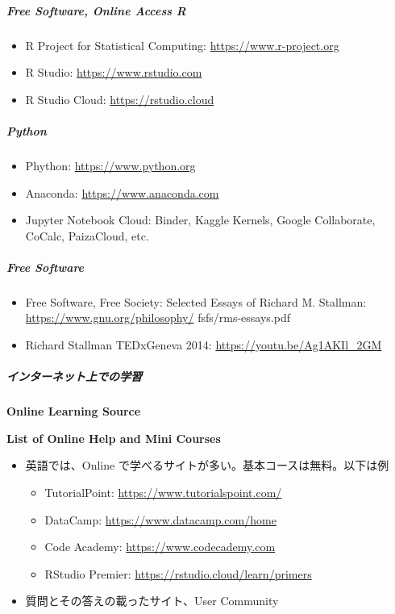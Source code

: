 \documentclass[
]{bxjsbook}
\providecommand{\tightlist}{%
  \setlength{\itemsep}{0pt}\setlength{\parskip}{0pt}}
\theoremstyle{definition}
\theoremstyle{definition}
\theoremstyle{definition}
\theoremstyle{definition}
\theoremstyle{remark}
\begin{document}
\hypertarget{free-software-online-access-r}{%
\subparagraph{Free Software, Online Access R}\label{free-software-online-access-r}}

\begin{itemize}
\tightlist
\item
  R Project for Statistical Computing: \url{https://www.r-project.org}
\item
  R Studio: \url{https://www.rstudio.com}
\item
  R Studio Cloud: \url{https://rstudio.cloud}
\end{itemize}

\hypertarget{python}{%
\subparagraph{Python}\label{python}}

\begin{itemize}
\tightlist
\item
  Phython: \url{https://www.python.org}
\item
  Anaconda: \url{https://www.anaconda.com}
\item
  Jupyter Notebook Cloud: Binder, Kaggle Kernels, Google Collaborate, CoCalc, PaizaCloud, etc.
\end{itemize}

\hypertarget{free-software}{%
\subparagraph{Free Software}\label{free-software}}

\begin{itemize}
\tightlist
\item
  Free Software, Free Society: Selected Essays of Richard M. Stallman: \url{https://www.gnu.org/philosophy/} fsfs/rms-essays.pdf
\item
  Richard Stallman TEDxGeneva 2014: \url{https://youtu.be/Ag1AKIl_2GM}
\end{itemize}

\hypertarget{ux30a4ux30f3ux30bfux30fcux30cdux30c3ux30c8ux4e0aux3067ux306eux5b66ux7fd2}{%
\subparagraph{インターネット上での学習}\label{ux30a4ux30f3ux30bfux30fcux30cdux30c3ux30c8ux4e0aux3067ux306eux5b66ux7fd2}}

\textbf{Online Learning Source}

\textbf{List of Online Help and Mini Courses}

\begin{itemize}
\item
  英語では、Online で学べるサイトが多い。基本コースは無料。以下は例

  \begin{itemize}
  \tightlist
  \item
    TutorialPoint: \url{https://www.tutorialspoint.com/}
  \item
    DataCamp: \url{https://www.datacamp.com/home}
  \item
    Code Academy: \url{https://www.codecademy.com}
  \item
    RStudio Premier: \url{https://rstudio.cloud/learn/primers}
  \end{itemize}
\item
  質問とその答えの載ったサイト、User Community
\end{itemize}
\end{document}
